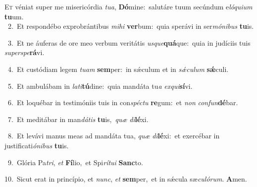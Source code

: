 \lettrine{\initial\textcolor{\initialcolor}{E}}{t} véniat super me misericórdia \textit{tu}\-\textit{a}, \textbf{Dó}\-mine:~\star salutáre tuum secúndum e\-\textit{ló}\-\textit{qui}\textit{um} \textbf{tu}\-um.\\
{\numbfont\textcolor{\numbcolor}{~2.}}~Et respondébo exprobrántibus \textit{mi}\-\textit{hi} \textbf{ver}\-bum:~\star quia sperávi in ser\-\textit{mó}\-\textit{ni}\textit{bus} \textbf{tu}\-is.\par
{\numbfont\textcolor{\numbcolor}{~3.}}~Et ne áuferas de ore meo verbum veritátis \textit{us}\-\textit{que}\textbf{quá}que:~\star quia in judíciis tuis \textit{su}\-\textit{per}\textit{spe}\textbf{rá}vi.\par
{\numbfont\textcolor{\numbcolor}{~4.}}~Et custódiam legem \textit{tu}\-\textit{am} \textbf{sem}\-per:~\star in sǽculum et in \textit{sǽ}\-\textit{cu}\textit{lum} \textbf{sǽ}\-culi.\par
{\numbfont\textcolor{\numbcolor}{~5.}}~Et ambulábam in \textit{la}\-\textit{ti}\textbf{tú}dine:~\star quia mandáta tu\textit{a} \textit{ex}\-\textit{qui}\textbf{sí}vi.\par
{\numbfont\textcolor{\numbcolor}{~6.}}~Et loquébar in testimóniis tuis in con\-\textit{spéc}\-\textit{tu} \textbf{re}\-gum:~\star et \textit{non} \textit{con}\-\textit{fun}\textbf{dé}bar.\par
{\numbfont\textcolor{\numbcolor}{~7.}}~Et meditábar in man\-\textit{dá}\-\textit{tis} \textbf{tu}\-is,~\star \textit{quæ} \textit{di}\-\textbf{lé}xi.\par
{\numbfont\textcolor{\numbcolor}{~8.}}~Et levávi manus meas ad mandáta tua, \textit{quæ} \textit{di}\-\textbf{lé}xi:~\star et exercébar in justificati\-\textit{ó}\-\textit{ni}\textit{bus} \textbf{tu}\-is.\par
{\numbfont\textcolor{\numbcolor}{~9.}}~Glória Pa\-\textit{tri}\-, \textit{et} \textbf{Fí}\-lio,~\star et Spi\-\textit{rí}\-\textit{tu}\textit{i} \textbf{Sanc}\-to.\par
{\numbfont\textcolor{\numbcolor}{10.}}~Sicut erat in princípio, et \textit{nunc}\-, \textit{et} \textbf{sem}\-per,~\star et in sǽcula sæ\-\textit{cu}\-\textit{ló}\textit{rum}. \textbf{A}\-men.\par
